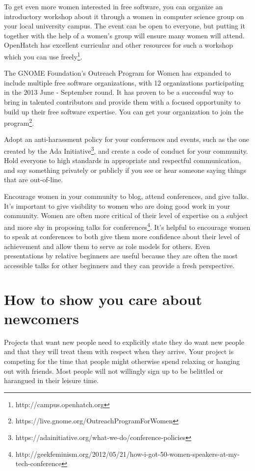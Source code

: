 To get even more women interested in free software, you can organize an introductory workshop about it through a women in computer science group on your local university campus. The event can be open to everyone, but putting it together with the help of a women’s group will ensure many women will attend. OpenHatch has excellent curricular and other resources for such a workshop which you can use freely\footnote{http://campus.openhatch.org}.

The GNOME Foundation’s Outreach Program for Women has expanded to include multiple free software organizations, with 12 organizations participating in the 2013 June - September round. It has proven to be a successful way to bring in talented contributors and provide them with a focused opportunity to build up their free software expertise. You can get your organization to join the program\footnote{https://live.gnome.org/OutreachProgramForWomen}.

Adopt an anti-harassment policy for your conferences and events, such as the one created by the Ada Initiative\footnote{https://adainitiative.org/what-we-do/conference-policies}, and create a code of conduct for your community. Hold everyone to high standards in appropriate and respectful communication, and say something privately or publicly if you see or hear someone saying things that are out-of-line.

Encourage women in your community to blog, attend conferences, and give talks. It’s important to give visibility to women who are doing good work in your community. Women are often more critical of their level of expertise on a subject and more shy in proposing talks for conferences\footnote{http://geekfeminism.org/2012/05/21/how-i-got-50-women-speakers-at-my-tech-conference}. It’s helpful to encourage women to speak at conferences to both give them more confidence about their level of achievement and allow them to serve as role models for others. Even presentations by relative beginners are useful because they are often the most accessible talks for other beginners and they can provide a fresh perspective.

\section{How to show you care about newcomers}
Projects that want new people need to explicitly state they do want new people and that they will treat them with respect when they arrive. Your project is competing for the time that people might otherwise spend relaxing or hanging out with friends. Most people will not willingly sign up to be belittled or harangued in their leisure time.  

